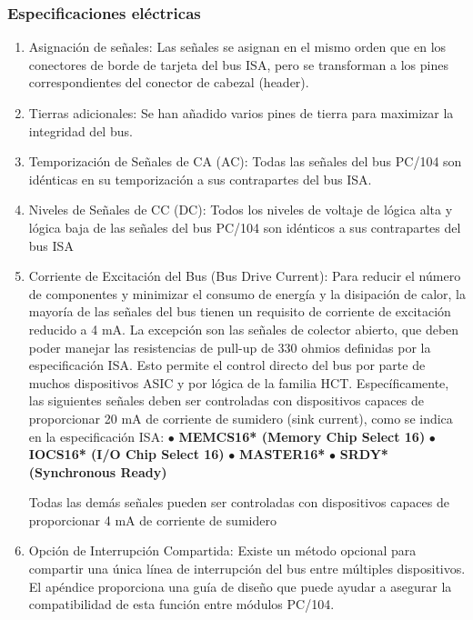 \documentclass[12pt]{article}
\begin{document}
	\subsubsection{Especificaciones eléctricas}
	\begin{enumerate}
		\item Asignación de señales: Las señales se asignan en el mismo orden que en los conectores de borde de tarjeta del bus ISA, pero se transforman a los pines correspondientes del conector de cabezal (header).
		
		\item Tierras adicionales: Se han añadido varios pines de tierra para maximizar la integridad del bus.
		
		\item Temporización de Señales de CA (AC): Todas las señales del bus PC/104 son idénticas en su temporización a sus contrapartes del bus ISA.
		
		\item Niveles de Señales de CC (DC): Todos los niveles de voltaje de lógica alta y lógica baja de las señales del bus PC/104 son idénticos a sus contrapartes del bus ISA
		
		\item Corriente de Excitación del Bus (Bus Drive Current): Para reducir el número de componentes y minimizar el consumo de energía y la disipación de calor, la mayoría de las señales del bus tienen un requisito de corriente de excitación reducido a 4 mA. La excepción son las señales de colector abierto, que deben poder manejar las resistencias de pull-up de 330 ohmios definidas por la especificación ISA. Esto permite el control directo del bus por parte de muchos dispositivos ASIC y por lógica de la familia HCT. Específicamente, las siguientes señales deben ser controladas con dispositivos capaces de proporcionar 20 mA de corriente de sumidero (sink current), como se indica en la especificación ISA:
			\subitem  $\bullet$ \textbf{MEMCS16* (Memory Chip Select 16)}
			\subitem  $\bullet$ \textbf{IOCS16* (I/O Chip Select 16)}
			\subitem  $\bullet$ \textbf{MASTER16*}
			\subitem  $\bullet$ \textbf{SRDY* (Synchronous Ready)}\newline
			
		Todas las demás señales pueden ser controladas con dispositivos capaces de proporcionar 4 mA de corriente de sumidero
		
		\item  Opción de Interrupción Compartida: Existe un método opcional para compartir una única línea de interrupción del bus entre múltiples dispositivos. El apéndice  proporciona una guía de diseño que puede ayudar a asegurar la compatibilidad de esta función entre módulos PC/104.
		

\end{enumerate}
\end{document}

